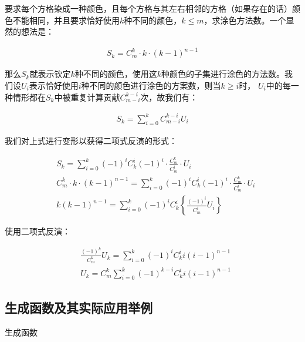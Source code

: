 \documentclass[UTF8]{book}
\begin{document}
要求每个方格染成一种颜色，且每个方格与其左右相邻的方格（如果存在的话）颜色不能相同，并且要求恰好使用$k$种不同的颜色，$k \le m$，求涂色方法数。一个显然的想法是：
\begin{large}
    \begin{equation}
        \begin{aligned}
            S_k = C_m^k \cdot k \cdot (k-1)^{n-1}
            \nonumber
        \end{aligned}
    \end{equation}
\end{large}
那么$S_k$就表示钦定$k$种不同的颜色，使用这$k$种颜色的子集进行涂色的方法数。我们设$U_i$表示恰好使用$i$种不同的颜色进行涂色的方案数，则当$k \ge i$时，
$U_i$中的每一种情形都在$S_k$中被重复计算贡献$C_{m-i}^{k-i}$次，故我们有：
\begin{large}
    \begin{equation}
        \begin{aligned}
            S_k = \sum_{i=0}^{k} C_{m-i}^{k-i} U_i
            \nonumber
        \end{aligned}
    \end{equation}
\end{large}
我们对上式进行变形以获得二项式反演的形式：
\begin{large}
    \begin{equation}
        \begin{aligned}
            &S_k = \sum_{i=0}^k (-1)^{i} C_k^i (-1)^{i} \cdot \frac{C_m^k}{C_m^i} \cdot U_i \\
            &C_m^k \cdot k \cdot (k-1)^{n-1} = \sum_{i=0}^k (-1)^{i} C_k^i (-1)^{i} \cdot \frac{C_m^k}{C_m^i} \cdot U_i \\
            &k(k-1)^{n-1}=\sum_{i=0}^k (-1)^{i} C_k^i \left \{ \frac{(-1)^{i}}{C_m^i}U_i \right \}
            \nonumber
        \end{aligned}
    \end{equation}
\end{large}
使用二项式反演：
\begin{large}
    \begin{equation}
        \begin{aligned}
            &\frac{(-1)^{k}}{C_m^k} U_k = \sum_{i=0}^k (-1)^{i} C_k^i i(i-1)^{n-1} \\
            &U_k = C_m^k \sum_{i=0}^k (-1)^{k-i} C_k^i i(i-1)^{n-1}
            \nonumber
        \end{aligned}
    \end{equation}
\end{large}

\subsection{生成函数及其实际应用举例}
生成函数
\end{document}

